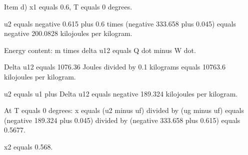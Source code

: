 Item d) x1 equals 0.6, T equals 0 degrees.

u2 equals negative 0.615 plus 0.6 times (negative 333.658 plus 0.045) equals negative 200.0828 kilojoules per kilogram.

Energy content: m times delta u12 equals Q dot minus W dot.

Delta u12 equals 1076.36 Joules divided by 0.1 kilograms equals 10763.6 kilojoules per kilogram.

u2 equals u1 plus Delta u12 equals negative 189.324 kilojoules per kilogram.

At T equals 0 degrees: x equals (u2 minus uf) divided by (ug minus uf) equals (negative 189.324 plus 0.045) divided by (negative 333.658 plus 0.615) equals 0.5677.

x2 equals 0.568.